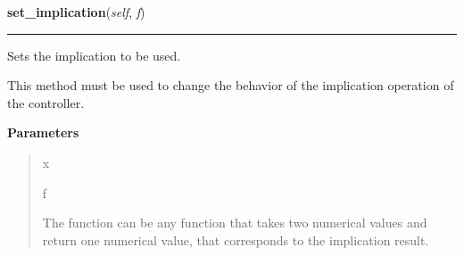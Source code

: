     \begin{boxedminipage}{\textwidth}

    \raggedright \textbf{set\_implication}(\textit{self}, \textit{f})

    \vspace{-1.5ex}

    \rule{\textwidth}{0.5\fboxrule}

Sets the implication to be used.

This method must be used to change the behavior of the implication
operation of the controller.
    \vspace{1ex}

      \textbf{Parameters}
      \begin{quote}
        \begin{Ventry}{x}

          \item[f]


The function can be any function that takes two numerical values and
return one numerical value, that corresponds to the implication
result.
        \end{Ventry}

      \end{quote}

    \vspace{1ex}

    \end{boxedminipage}

    \label{peach:fuzzy:control:Controller:set_aglutination}

    \vspace{0.5ex}


